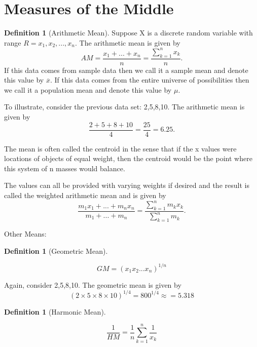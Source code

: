 \documentclass[10pt,]{book}
\theoremstyle{plain}
\theoremstyle{definition}
\newtheorem{definition}[theorem]{Definition}
\theoremstyle{definition}
\theoremstyle{definition}
\numberwithin{equation}{section}
\begin{document}
\section[{Measures of the Middle}]{Measures of the Middle}\label{section-7}
\begin{definition}[{Arithmetic Mean}]\label{definition-7}
Suppose X is a discrete random variable with range 
	\(R = {x_1, x_2, ..., x_n}\). 
	The arithmetic mean is given by
		\begin{equation*}
		AM = \frac{x_1 + ... + x_n}{n} = \frac{\sum_{k=1}^n x_k}{n}.
		\end{equation*}
	If this data comes from sample data then we call it a sample mean and denote this value by \(\overline{x}\). If this data comes from the entire universe of possibilities then we call it a population mean and denote this value by \(\mu\).%
\end{definition}

	To illustrate, consider the previous data set: {2,5,8,10}. The arithmetic mean is given by
	\begin{equation*}\frac{2+5+8+10}{4} = \frac{25}{4} = 6.25.\end{equation*}
\par

	The mean is often called the centroid in the sense that if the x values were locations of objects of equal weight, then the centroid
	would be the point where this system of n masses would balance. 
\par

	The values can all be provided with varying weights if desired and the result is called the weighted arithmetic mean and is given by
		\begin{equation*}
		\frac{m_1 x_1 + ... + m_n x_n}{m_1 + ... + m_n} = \frac{\sum_{k=1}^n m_k x_k}{\sum_{k=1}^n m_k}.
		\end{equation*}
\par

Other Means:
%
\begin{definition}[{Geometric Mean}]\label{definition-8}

	\begin{equation*}GM = (x_1 x_2 ... x_n)^{1/n}\end{equation*}
%
\end{definition}
\par

	Again, consider {2,5,8,10}. The geometric mean is given by
	\begin{equation*}(2 \times 5 \times 8 \times 10)^{1/4} = 800^{1/4} \approx = 5.318\end{equation*}
\begin{definition}[{Harmonic Mean}]\label{definition-9}

	\begin{equation*}\frac{1}{HM} = \frac{1}{n} \sum_{k=1}^n \frac{1}{x_k}\end{equation*}
%
\end{definition}
\par
\end{document}
